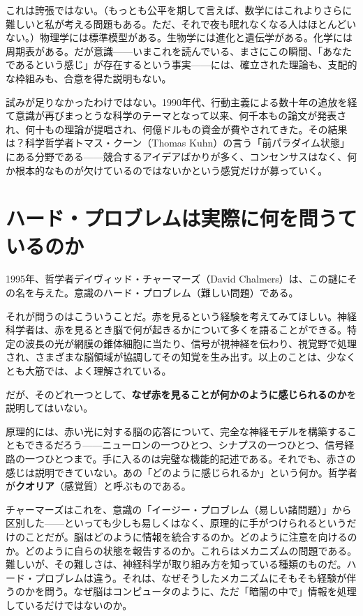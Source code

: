 \documentclass[11pt, twoside, openright]{book}
\begin{document}
これは誇張ではない。（もっとも公平を期して言えば、数学にはこれよりさらに難しいと私が考える問題もある。ただ、それで夜も眠れなくなる人はほとんどいない。）物理学には標準模型がある。生物学には進化と遺伝学がある。化学には周期表がある。だが意識------いまこれを読んでいる、まさにこの瞬間、「あなたであるという感じ」が存在するという事実------には、確立された理論も、支配的な枠組みも、合意を得た説明もない。

試みが足りなかったわけではない。1990年代、行動主義による数十年の追放を経て意識が再びまっとうな科学のテーマとなって以来、何千本もの論文が発表され、何十もの理論が提唱され、何億ドルもの資金が費やされてきた。その結果は？科学哲学者トマス・クーン（Thomas Kuhn）の言う「前パラダイム状態」にある分野である------競合するアイデアばかりが多く、コンセンサスはなく、何か根本的なものが欠けているのではないかという感覚だけが募っていく。

\section*{ハード・プロブレムは実際に何を問うているのか}

1995年、哲学者デイヴィッド・チャーマーズ（David Chalmers）は、この謎にその名を与えた。意識のハード・プロブレム（難しい問題）である。

それが問うのはこういうことだ。赤を見るという経験を考えてみてほしい。神経科学者は、赤を見るとき脳で何が起きるかについて多くを語ることができる。特定の波長の光が網膜の錐体細胞に当たり、信号が視神経を伝わり、視覚野で処理され、さまざまな脳領域が協調してその知覚を生み出す。以上のことは、少なくとも大筋では、よく理解されている。

だが、そのどれ一つとして、\textbf{なぜ赤を見ることが何かのように感じられるのか}を説明してはいない。

原理的には、赤い光に対する脳の応答について、完全な神経モデルを構築することもできるだろう------ニューロンの一つひとつ、シナプスの一つひとつ、信号経路の一つひとつまで。手に入るのは完璧な機能的記述である。それでも、赤さの感じは説明できていない。あの「どのように感じられるか」という何か。哲学者が\textbf{クオリア}（感覚質）と呼ぶものである。

チャーマーズはこれを、意識の「イージー・プロブレム（易しい諸問題）」から区別した------といっても少しも易しくはなく、原理的に手がつけられるというだけのことだが。脳はどのように情報を統合するのか。どのように注意を向けるのか。どのように自らの状態を報告するのか。これらはメカニズムの問題である。難しいが、その難しさは、神経科学が取り組み方を知っている種類のものだ。ハード・プロブレムは違う。それは、なぜそうしたメカニズムにそもそも経験が伴うのかを問う。なぜ脳はコンピュータのように、ただ「暗闇の中で」情報を処理しているだけではないのか。
\end{document}
